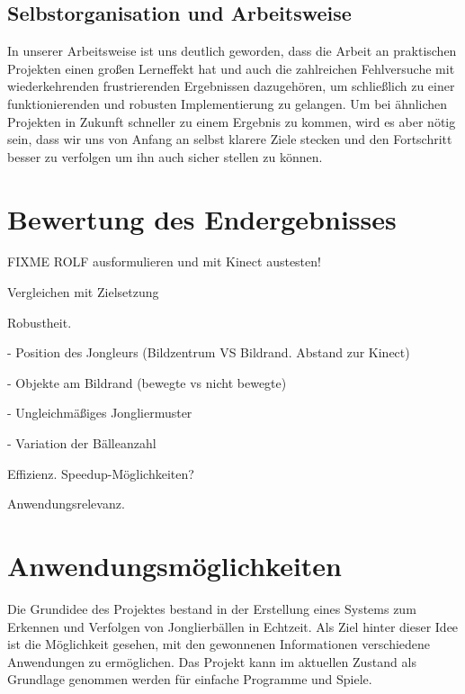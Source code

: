 \documentclass[12pt,a4paper,ngerman]{scrartcl}
\begin{document}
\subsection{Selbstorganisation und Arbeitsweise}

In unserer Arbeitsweise ist uns deutlich geworden, dass die Arbeit an praktischen
Projekten einen großen Lerneffekt hat und auch die zahlreichen Fehlversuche mit
wiederkehrenden frustrierenden Ergebnissen dazugehören, um schließlich zu einer
funktionierenden und robusten Implementierung zu gelangen. Um bei ähnlichen
Projekten in Zukunft schneller zu einem Ergebnis zu kommen, wird es aber nötig
sein, dass wir uns von Anfang an selbst klarere Ziele stecken und den Fortschritt
besser zu verfolgen um ihn auch sicher stellen zu können. %





\section{Bewertung des Endergebnisses}

{\color{red} FIXME ROLF ausformulieren und mit Kinect austesten!}

Vergleichen mit Zielsetzung

Robustheit.

  - Position des Jongleurs (Bildzentrum VS Bildrand. Abstand zur Kinect)

  - Objekte am Bildrand (bewegte vs nicht bewegte)

  - Ungleichmäßiges Jongliermuster

  - Variation der Bälleanzahl

Effizienz. Speedup-Möglichkeiten?

Anwendungsrelevanz.

\section{Anwendungsmöglichkeiten}

Die Grundidee des Projektes bestand in der Erstellung eines Systems zum Erkennen und
Verfolgen von Jonglierbällen in Echtzeit. Als Ziel hinter dieser Idee ist die
Möglichkeit gesehen, mit den gewonnenen Informationen verschiedene Anwendungen zu
ermöglichen. Das Projekt kann im aktuellen Zustand als Grundlage genommen werden
für einfache Programme und Spiele.
\end{document}
